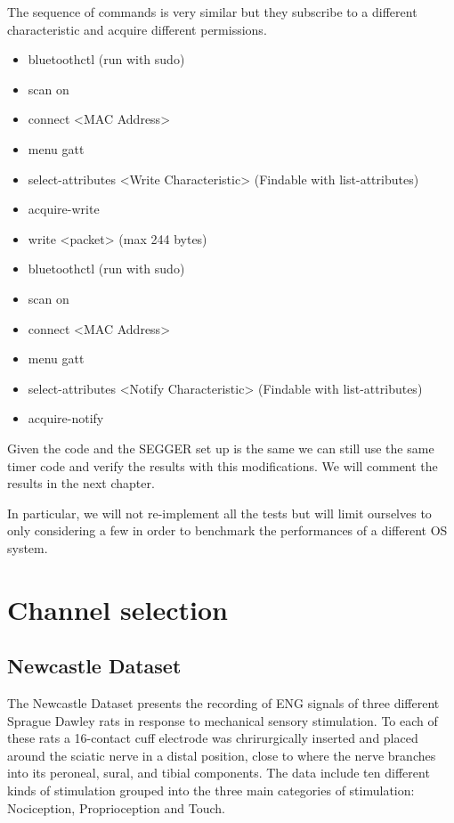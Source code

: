 \documentclass{Configuration_Files/PoliMi3i_thesis}
\begin{document}
The sequence of commands is very similar but they subscribe to a different characteristic and acquire different permissions.

\begin{itemize}
	\item bluetoothctl (run with sudo)\
	\item scan on
	\item connect <MAC Address>
	\item menu gatt
	\item select-attributes <Write Characteristic> (Findable with list-attributes)
	\item acquire-write
	\item write <packet> (max 244 bytes)
\end{itemize}

\begin{itemize}
	\item bluetoothctl (run with sudo)\
	\item scan on
	\item connect <MAC Address>
	\item menu gatt
	\item select-attributes <Notify Characteristic> (Findable with list-attributes)
	\item acquire-notify
\end{itemize}

Given the code and the SEGGER set up is the same we can still use the same timer code and verify the results with this modifications.
We will comment the results in the next chapter.

In particular, we will not re-implement all the tests but will limit ourselves to only considering a few in order to benchmark the performances of a different OS system.



\section{Channel selection}

\subsection{Newcastle Dataset}

The Newcastle Dataset presents the recording of ENG signals of three different Sprague Dawley rats in response to mechanical sensory stimulation.
To each of these rats a 16-contact cuff electrode was chrirurgically inserted and placed around the sciatic nerve in a distal position, close to where the nerve branches into its peroneal, sural, and tibial components.
The data include ten different kinds of stimulation grouped into the three main categories of stimulation: Nociception, Proprioception and Touch.
\end{document}
